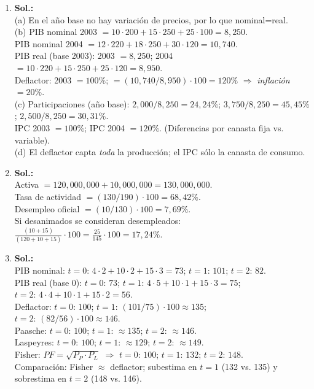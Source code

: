 \documentclass[11pt,addpoints]{article}
\begin{document}
\begin{enumerate}
\item \textbf{Sol.:}\\
(a) En el año base no hay variación de precios, por lo que nominal=real.\\
(b) PIB nominal 2003 $=10\cdot200+15\cdot250+25\cdot100=8{,}250$.\\
PIB nominal 2004 $=12\cdot220+18\cdot250+30\cdot120=10{,}740$.\\
PIB real (base 2003): 2003 $=8{,}250$; 2004 $=10\cdot220+15\cdot250+25\cdot120=8{,}950$.\\
Deflactor: 2003 $=100\%$; $=(10{,}740/8{,}950)\cdot100=120\%$ $\Rightarrow$ \textit{inflación} $=20\%$.\\
(c) Participaciones (año base): $2{,}000/8{,}250=24{,}24\%$; $3{,}750/8{,}250=45{,}45\%$; $2{,}500/8{,}250=30{,}31\%$.\\
IPC 2003 $=100\%$;\; IPC 2004 $=120\%$.\; (Diferencias por canasta fija vs. variable).\\
(d) El deflactor capta \textit{toda} la producción; el IPC sólo la canasta de consumo.

\bigskip

\item \textbf{Sol.:}\\
Activa $=120{,}000{,}000+10{,}000{,}000=130{,}000{,}000$.\\
Tasa de actividad $=(130/190)\cdot100=68{,}42\%$.\\
Desempleo oficial $=(10/130)\cdot100=7{,}69\%$.\\
Si desanimados se consideran desempleados: $\frac{(10+15)}{(120+10+15)}\cdot100=\frac{25}{145}\cdot100=17{,}24\%$.

\bigskip



\item \textbf{Sol.:}\\
PIB nominal: $t=0:\,4\cdot2+10\cdot2+15\cdot3=73$;\; $t=1:\,101$;\; $t=2:\,82$.\\
PIB real (base 0): $t=0:\,73$;\; $t=1:\,4\cdot5+10\cdot1+15\cdot3=75$;\; $t=2:\,4\cdot4+10\cdot1+15\cdot2=56$.\\
Deflactor: $t=0:\,100$;\; $t=1:\,(101/75)\cdot100\approx 135$;\; $t=2:\,(82/56)\cdot100\approx 146$.\\
Paasche: $t=0:\,100$;\; $t=1:\,\approx 135$;\; $t=2:\,\approx 146$.\\
Laspeyres: $t=0:\,100$;\; $t=1:\,\approx 129$;\; $t=2:\,\approx 149$.\\
Fisher: $PF=\sqrt{P_P\cdot P_L}$ $\Rightarrow$ $t=0:\,100$;\; $t=1:\,132$;\; $t=2:\,148$.\\
Comparación: Fisher $\approx$ deflactor; subestima en $t=1$ (132 vs. 135) y sobrestima en $t=2$ (148 vs. 146).

\end{enumerate}
\end{document}
